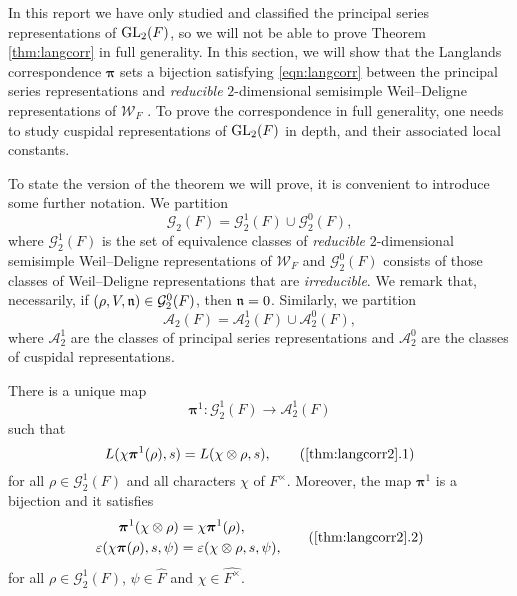 In this report we have only studied and classified the principal series representations of $\mathrm{GL}_2(F)$, so we will not be able to prove Theorem \ref{thm:langcorr} in full generality. In this section, we will show that the Langlands correspondence $\bm\pi$ sets a bijection satisfying \eqref{eqn:langcorr} between the principal series representations and \textit{reducible} $2$-dimensional semisimple Weil--Deligne representations of $\mathcal{W}_F$ . To prove the correspondence in full generality, one needs to study cuspidal representations of $\mathrm{GL}_2(F)$ in depth, and their associated local constants. 

To state the version of the theorem we will prove, it is convenient to introduce some further notation. We partition 
$$\mathcal{G}_2(F)=\mathcal{G}_2^1(F)\cup\mathcal{G}_2^0(F),$$
where $\mathcal{G}_2^1(F)$ is the set of equivalence classes of \textit{reducible} $2$-dimensional semisimple Weil--Deligne representations of $\mathcal{W}_F$ and $\mathcal{G}_2^0(F)$ consists of those classes of Weil--Deligne representations that are \textit{irreducible}. We remark that, necessarily, if $(\rho,V,\mathfrak{n})\in\mathcal{G}_2^0(F)$, then $\mathfrak{n}=0$. Similarly, we partition
$$\mathcal{A}_2(F)=\mathcal{A}_2^1(F)\cup\mathcal{A}_2^0(F),$$ 
where $\mathcal{A}_2^1$ are the classes of principal series representations and $\mathcal{A}_2^0$ are the classes of cuspidal representations.

\begin{thm}\label{thm:langcorr2}
    There is a unique map
    $$\bm\pi^1:\mathcal{G}_2^1(F)\longrightarrow\mathcal{A}_2^1(F)$$
    such that 
    \begin{equation}
        L(\chi\bm\pi^1(\rho),s)=L(\chi\otimes\rho,s),
        \label{eqn:langcorrLfunc}\tag{\ref{thm:langcorr2}.1}
    \end{equation}
    for all $\rho\in\mathcal{G}_2^1(F)$ and all characters $\chi$ of $F^\times$. Moreover, the map $\bm\pi^1$ is a bijection and it satisfies
    \begin{equation}
        \begin{split}
            \bm\pi^1(\chi\otimes\rho)&=\chi\bm\pi^1(\rho),\\
            \varepsilon(\chi\bm\pi(\rho),s,\psi)&=\varepsilon(\chi\otimes\rho,s,\psi),
        \end{split}
        \label{eqn:langcorreps}\tag{\ref{thm:langcorr2}.2}
    \end{equation}
    for all $\rho\in\mathcal{G}_2^1(F)$, $\psi\in\hat{F}$ and $\chi\in\hat{F^\times}$.
\end{thm}

